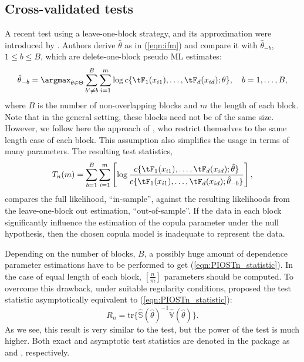 \subsection{Cross-validated tests}\label{subsec:gof_PIOS}
A recent test using a leave-one-block strategy, and its approximation were introduced by \citet{zhang_okhrin_song_zhou_2016}. Authors derive $\hat{\theta}$ as in (\ref{eqn:ifm}) and compare it with $\hat{\theta}_{-b}$, $1 \leq b \leq B$, which are delete-one-block pseudo ML estimates:
	\begin{align*}
		\hat{\theta}_{-b} = \argmax_{\theta \in \Theta} \sum_{b' \neq b}^{B} \sum_{i=1}^{m} \log c\{ \tF_{1}(x_{i1}), \ldots, \tF_{d}(x_{id}); \theta \}, \quad b = 1, \ldots, B,
	\end{align*}
where $B$ is the number of non-overlapping blocks and $m$ the length of each block. Note that in the general setting, these blocks need not be of the same size. However, we follow here the approach of \citet{zhang_okhrin_song_zhou_2016}, who restrict themselves to the same length case of each block. This assumption also simplifies the usage in terms of many parameters. The resulting test statistics,
\begin{align} \label{eqn:PIOSTn_statistic}
T_n(m) = \sum_{b=1}^B \sum_{i=1}^m \left[ \log\frac{c\{ \tF_{1}(x_{i1}), \ldots, \tF_{d}(x_{id}); \hat{\theta} \}}{ c \{ \tF_{1}(x_{i1}), \ldots, \tF_{d}(x_{id}); \hat{\theta}_{-b} \}}\right],
\end{align}
compares the full likelihood, ``in-sample'', against the resulting likelihoods from the leave-one-block out estimation, ``out-of-sample''. If the data in each block significantly influence the estimation of the copula parameter under the null hypothesis, then the chosen copula model is inadequate to represent the data.

Depending on the number of blocks, $B$, a possibly huge amount of dependence parameter estimations have to be performed to get (\ref{eqn:PIOSTn_statistic}). In the case of equal length of each block, $[\frac{n}{m}]$ parameters should be computed. To overcome this drawback, under suitable regularity conditions, \citet{zhang_okhrin_song_zhou_2016} proposed the test statistic asymptotically equivalent to (\ref{eqn:PIOSTn_statistic}):
\begin{equation}
R_n = \text{tr}\{\widehat{\mathbb{S}}(\hat\theta)^{-1}\widehat{\mathbb{V}}(\hat\theta)\}.
\end{equation}
As we see, this result is very similar to the \citet{white1982maximum} test, but the power of the test is much higher. Both exact and asymptotic test statistics are denoted in the package as  and , respectively.

